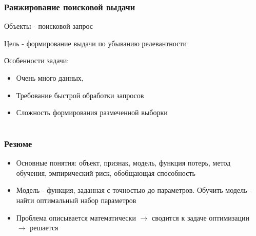 \documentclass{beamer}
\begin{document}
	
	\begin{frame}
		\frametitle{Ранжирование поисковой выдачи}
		Объекты - поисковой запрос
		
		Цель - формирование выдачи по убыванию релевантности
		
		\vspace{15pt}
				
		Особенности задачи:
		\begin{itemize}
			\item Очень много данных, 
			\item Требование быстрой обработки запросов
			\item Сложность формирования размеченной выборки
		\end{itemize}	
	\end{frame}
	

	\section[]{}
	
	
	\begin{frame}
		\frametitle{Резюме}
		\begin{itemize}
			\item Основные понятия: объект, признак, модель, функция потерь, метод обучения, эмпирический риск, обобщающая способность
			\item Модель - функция, заданная с точностью до параметров. Обучить модель - найти оптимальный набор параметров
			\item Проблема описывается математически $\to$ сводится к задаче оптимизации $\to$ решается
		\end{itemize}
	\end{frame}
		
\end{document}
